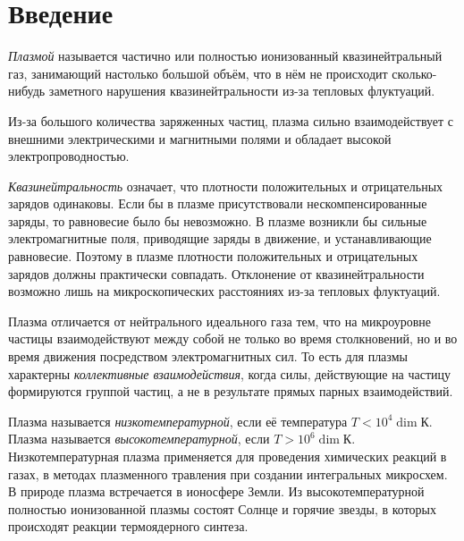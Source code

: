 \section*{Введение}

\textit{Плазмой} называется частично или полностью ионизованный квазинейтральный газ, занимающий настолько большой объём, что в нём не происходит сколько-нибудь заметного нарушения квазинейтральности из-за тепловых флуктуаций. 

Из-за большого количества заряженных частиц, плазма сильно взаимодействует с внешними электрическими и магнитными полями и обладает высокой электропроводностью. 

\textit{Квазинейтральность} означает, что плотности положительных и отрицательных зарядов одинаковы. Если бы в плазме присутствовали нескомпенсированные заряды, то равновесие было бы невозможно. В плазме возникли бы сильные электромагнитные поля, приводящие заряды в движение, и устанавливающие равновесие. Поэтому в плазме плотности положительных и отрицательных зарядов должны практически совпадать. Отклонение от квазинейтральности возможно лишь на микроскопических расстояниях из-за тепловых флуктуаций.

Плазма отличается от нейтрального идеального газа тем, что на микроуровне частицы взаимодействуют между собой не только во время столкновений, но и во время движения посредством электромагнитных сил. То есть для плазмы характерны \textit{коллективные взаимодействия}, когда силы, действующие на частицу формируются группой частиц, а не в результате прямых парных взаимодействий. 

Плазма называется \textit{низкотемпературной}, если её температура  $T < 10^4 \dim К$. Плазма называется \textit{высокотемпературной}, если $T > 10^6 \dim К$. Низкотемпературная плазма применяется для проведения химических реакций в газах, в методах плазменного травления при создании интегральных микросхем. В природе плазма встречается в ионосфере Земли. Из высокотемпературной полностью ионизованной плазмы состоят Солнце и горячие звезды, в которых происходят реакции термоядерного синтеза.